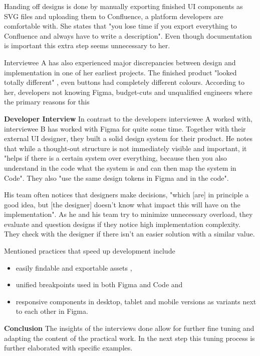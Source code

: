 Handing off designs is done by manually exporting finished UI components as SVG files and
uploading them to Confluence, a platform developers are comfortable with. She states that "you lose
time if you export everything to Confluence and always have to write a description".
 Even though documentation is important
this extra step seems unnecessary to her.

Interviewee A has also experienced major discrepancies between design and implementation in one of her
earliest projects. The finished product "looked totally different"
, even buttons had completely different
colours. According to her, developers not knowing Figma, budget-cuts and unqualified engineers where
the primary reasons for this 

\textbf{Developer Interview}
In contrast to the developers interviewee A worked with, interviewee B has worked with Figma for
quite some time. Together with their external UI designer, they built a solid design system for
their product. He notes that while a thought-out structure is not immediately visible and important,
it "helps if there is a certain system over everything, because then you also understand in the code
what the system is and can then map the system in Code".
 They also "use the same
design tokens in Figma and in the code". 

His team often notices that designers make decisions, "which [are] in principle a good idea, but
    [the designer] doesn't know what impact this will have on the implementation".
 As he and his team try to minimize
unnecessary overload, they evaluate and question designs if they notice high implementation
complexity. They check with the designer if there isn't an easier solution with
a similar value. 

Mentioned practices that speed up development include
\begin{itemize}
    \item easily findable and exportable assets ,
    \item unified breakpoints used in both Figma and Code
           and
    \item responsive components in desktop, tablet and mobile versions as variants next to each
          other in Figma. 
\end{itemize}

\textbf{Conclusion}
The insights of the interviews done allow for further fine tuning and adapting the content of the
practical work. In the next step this tuning process is further elaborated with specific examples.
